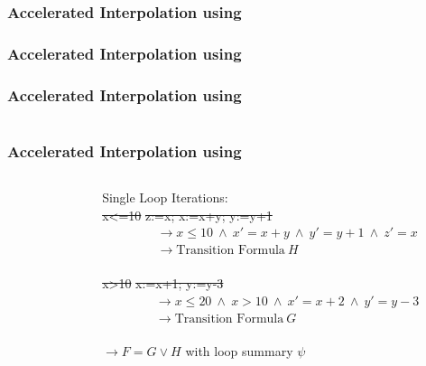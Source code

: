 \begin{frame}[t]
	\frametitle{Accelerated Interpolation using \qvasr}
	\resizebox{\textwidth}{!}{}
\end{frame}

\begin{frame}[t]
	\frametitle{Accelerated Interpolation using \qvasr}
	\resizebox{0.5\textwidth}{!}{}
\end{frame}

\begin{frame}[t]
	\frametitle{Accelerated Interpolation using \qvasr}
	\begin{columns}
		\begin{column}{0.35\textwidth}
			\resizebox{0.8\textwidth}{!}{}
		\end{column}
		\begin{column}{0.55\textwidth}
			\onslide<2-5>
			\resizebox{0.4\textwidth}{!}{}
		\end{column}
	\end{columns}
\end{frame}

\begin{frame}[t]
	\frametitle{Accelerated Interpolation using \qvasr}
	\begin{columns}
		\begin{column}{0.35\textwidth}
			\resizebox{0.8\textwidth}{!}{}
		\end{column}
		\begin{column}{0.55\textwidth}
			Single Loop Iterations: \vspace*{0.25cm}\\
			\st{x<=10} \st{z:=x; x:=x+y; y:=y+1}
			\onslide<2->
			{\small 
			\begin{align*}
			&\rightarrow x \leq 10\ \land\ x' = x + y\ \land\ y' = y + 1\ \land\ z' = x \\
			&\rightarrow \text{Transition Formula}\ H 
			\end{align*}
			}%
			\onslide<1-> \\
			\vspace*{1cm}\st{x>10} \st{x:=x+1; y:=y-3}
			\onslide<2->
			\begin{align*}
			&\rightarrow	x \leq 20\ \land\ x > 10\ \land\ x' = x + 2\ \land\ y' = y -3 \\
			&\rightarrow \text{Transition Formula}\ G
			\end{align*}
			\onslide<3-> \\
			\vspace*{1cm}
			$\rightarrow F = G \lor H$ \onslide<4-> with loop summary \color<4->{emblue} $\psi$
		\end{column}
	\end{columns}
\end{frame}

